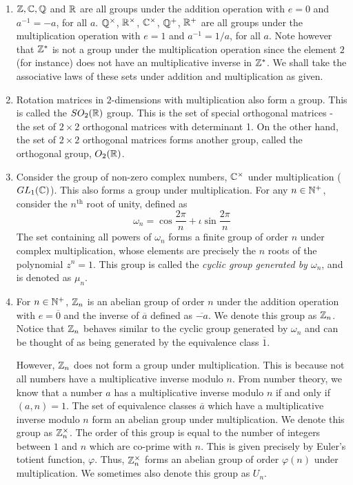 \begin{ex}\phantom{hi}
\begin{enumerate}
\item $\mathbb{Z}, \mathbb{C}, \mathbb{Q}$ and $\mathbb{R}$ are all groups under the addition operation with $e = 0$ and $a^{-1} = -a$, for all $a$. $\mathbb{Q}^{\times}$, $\mathbb{R}^{\times}$, $\mathbb{C}^{\times}$, $\mathbb{Q}^+$, $\mathbb{R}^+$ are all groups under the multiplication operation with $e = 1$ and $a^{-1} = 1/a$, for all $a$. Note however that $\mathbb{Z}^{\ast}$ is not a group under the multiplication operation since the element $2$ (for instance) does not have an multiplicative inverse in $\mathbb{Z}^{\ast}$. We shall take the associative laws of these sets under addition and multiplication as given. 
    \item Rotation matrices in $2$-dimensions with multiplication also form a group. This is called the $SO_2(\mathbb{R})$ group. This is the set of special orthogonal matrices - the set of $2 \times 2$ orthogonal matrices with determinant 1. On the other hand, the set of $2 \times 2$ orthogonal matrices forms another group, called the orthogonal group, $O_2(\mathbb{R})$.
    \item Consider the group of non-zero complex numbers, $\mathbb{C}^{\times}$ under multiplication ($GL_1(\mathbb{C})$). This also forms a group under multiplication. For any $n \in \mathbb{N}^+$, consider the $n^{\text{th}}$ root of unity, defined as
\[
    \omega_n = \cos \frac{2\pi}{n} + \iota \sin \frac{2\pi}{n}
\]
The set containing all powers of $\omega_n$ forms a finite group of order $n$ under complex multiplication, whose elements are precisely the $n$ roots of the polynomial $z^n = 1$. This group is called the \emph{cyclic group generated by $\omega_n$}, and is denoted as $\mu_n$.
\item For $n \in \mathbb{N}^+$, $\mathbb{Z}_n$ is an abelian group of order $n$ under the addition operation with $e = \overline{0}$ and the inverse of $\overline{a}$ defined as $\overline{-a}$. We denote this group as $\mathbb{Z}_n$. Notice that $\mathbb{Z}_n$ behaves similar to the cyclic group generated by $\omega_n$ and can be thought of as being generated by the equivalence class $\overline{1}$.

However, $\mathbb{Z}_n$ does not form a group under multiplication. This is because not all numbers have a multiplicative inverse modulo $n$. From number theory, we know that a number $a$ has a multiplicative inverse modulo $n$ if and only if $(a,n) = 1$. The set of equivalence classes $\overline{a}$ which have a multiplicative inverse modulo $n$ form an abelian group under multiplication. We denote this group as $\mathbb{Z}_n^{\times}$. The order of this group is equal to the number of integers between $1$ and $n$ which are co-prime with $n$. This is given precisely by Euler's totient function, $\varphi$. Thus, $\mathbb{Z}_n^{\times}$ forms an abelian group of order $\varphi(n)$ under multiplication. We sometimes also denote this group as $U_n$.
\end{enumerate}

\end{ex}


